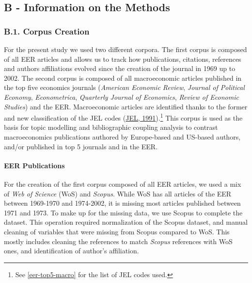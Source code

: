 \documentclass[
  12pt,
  onecolumn]{article}
\begin{document}
\newpage

\hypertarget{appendix}{%
\subsection*{B - Information on the Methods}\label{appendix}}

\hypertarget{corpus}{%
\subsubsection*{B.1. Corpus Creation}\label{corpus}}

For the present study we used two different corpora. The first corpus is
composed of all EER articles and allows us to track how publications,
citations, references and authors affiliations evolved since the
creation of the journal in 1969 up to 2002. The second corpus is
composed of all macroeconomic articles published in the top five
economics journals (\emph{American Economic Review}, \emph{Journal of
Political Economy}, \emph{Econometrica}, \emph{Quarterly Journal of
Economics}, \emph{Review of Economic Studies}) and the EER.
Macroeconomic articles are identified thanks to the former and new
classification of the JEL codes (\protect\hyperlink{ref-jel1991}{JEL,
1991}).\footnote{See \ref{eer-top5-macro} for the list of JEL codes
  used.} This corpus is used as the basis for topic modelling and
bibliographic coupling analysis to contrast macroeconomics publications
authored by Europe-based and US-based authors, and/or published in top 5
journals and in the EER.

\hypertarget{eer-publications}{%
\paragraph*{EER Publications}\label{eer-publications}}

For the creation of the first corpus composed of all EER articles, we
used a mix of \emph{Web of Science} (WoS) and \emph{Scopus}. While WoS
has all articles of the EER between 1969-1970 and 1974-2002, it is
missing most articles published between 1971 and 1973. To make up for
the missing data, we use Scopus to complete the dataset. This operation
required normalization of the Scopus dataset, and manual cleaning of
variables that were missing from Scopus compared to WoS. This mostly
includes cleaning the references to match \emph{Scopus} references with
WoS ones, and identification of author's affiliation.
\end{document}

